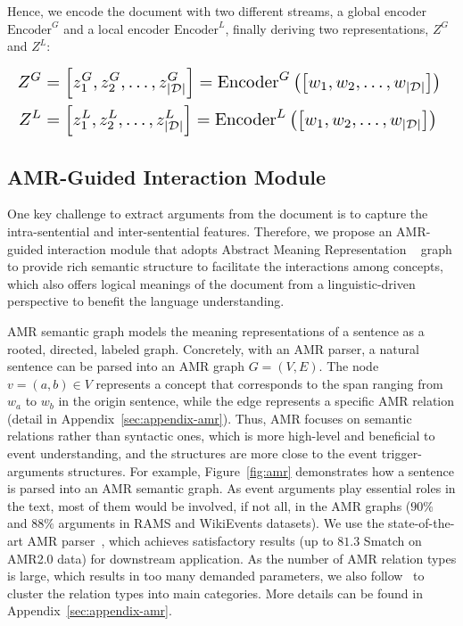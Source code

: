 Hence, we encode the document with two different streams, a global encoder $\mathrm{Encoder}^G$ and a local encoder $\mathrm{Encoder}^L$, finally deriving two representations, $Z^G$ and $Z^L$:

\begin{equation*}
\resizebox{\linewidth}{!}{$
\begin{aligned} 
Z^G &= \left [z_1^G, z_2^G, \dots, z^G_{\left | \mathcal{D} \right | } \right ] = \mathrm{Encoder}^G \left (\left [w_1, w_2, \dots, w_{\left | \mathcal{D} \right | } \right ] \right ) \\
Z^L &= \left [z_1^L, z_2^L, \dots, z^L_{\left | \mathcal{D} \right | } \right ] = \mathrm{Encoder}^L \left ( \left [w_1, w_2, \dots, w_{\left | \mathcal{D} \right | } \right ] \right )
\end{aligned}
$
}
\end{equation*}


\subsection{AMR-Guided Interaction Module}


One key challenge to extract arguments from the document is to capture the intra-sentential and inter-sentential features.
Therefore, we propose an AMR-guided  interaction module that adopts Abstract Meaning Representation ~\cite[AMR,][]{banarescu-etal-2013-abstract} graph to provide rich semantic structure to facilitate the interactions among concepts, which also offers logical meanings of the document from a linguistic-driven perspective to benefit the language understanding.

AMR semantic graph models the meaning representations of a sentence as a rooted, directed, labeled graph.
Concretely, with an AMR parser, a natural sentence can be parsed into an AMR graph $G=(V, E)$.
The node $v=(a,b) \in V$ represents a concept that corresponds to the span ranging from $w_a$ to $w_b$ in the origin sentence, while the edge represents a specific AMR relation (detail in Appendix~\ref{sec:appendix-amr}).
Thus, AMR focuses on semantic relations rather than syntactic ones, which is more high-level and beneficial to event understanding, and the structures are more close to the event trigger-arguments  structures.
For example, Figure~\ref{fig:amr} demonstrates how a sentence is parsed into an AMR semantic graph.
As event arguments play essential roles in the text, most of them would be involved, if not all, in the AMR graphs ($90\%$ and $88\%$ arguments in RAMS and WikiEvents datasets).
We use the state-of-the-art AMR parser~\citet{fernandez-astudillo-etal-2020-transition}, which achieves satisfactory results (up to $81.3$ Smatch on AMR2.0 data) for downstream application.
As the number of AMR relation types is large, which results in too many demanded parameters, we also follow~\citet{zhangzixuan} to cluster the relation types into main categories.
More details can be found in Appendix~\ref{sec:appendix-amr}.

